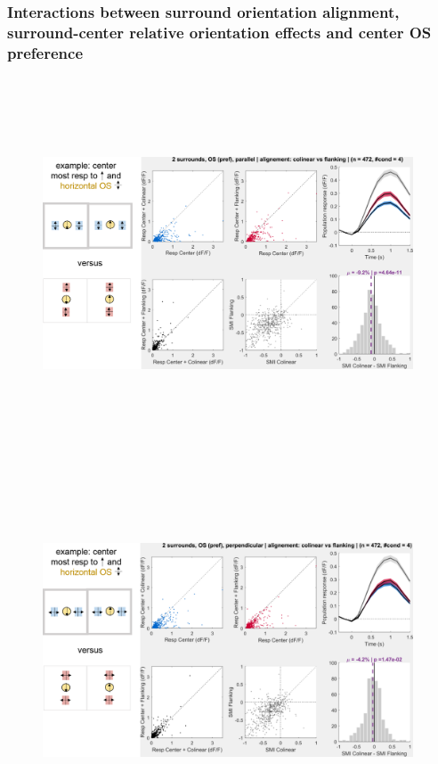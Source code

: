 \subsubsection{Interactions between surround orientation alignment, surround-center relative orientation effects and center OS preference}

\begin{figure}[H] \centering \includegraphics[width=11cm,height=11cm,keepaspectratio]{Figures/7.Results/population/sel/diagrams/13.png} 
\end{figure}

\begin{figure}[H] \centering \includegraphics[width=11cm,height=11cm,keepaspectratio]{Figures/7.Results/population/sel/diagrams/14.png} 
\end{figure}

